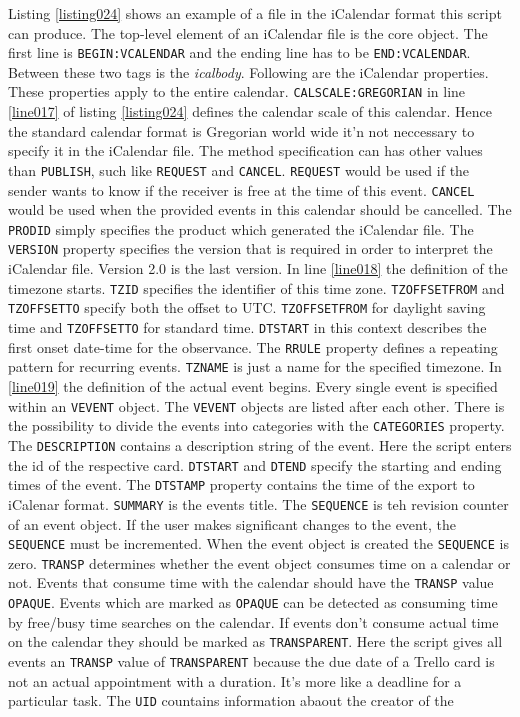 Listing \ref{listing024} shows an example of a file in the iCalendar format this script can produce. The top-level element of an iCalendar file is the core object. The first line is \lstinline{BEGIN:VCALENDAR} and the ending line has to be \lstinline{END:VCALENDAR}. Between these two tags is the \emph{icalbody}. Following are the iCalendar properties. These properties apply to the entire calendar. \lstinline{CALSCALE:GREGORIAN} in line \ref{line017} of listing \ref{listing024} defines the calendar scale of this calendar. Hence the standard calendar format is Gregorian world wide it'n not neccessary to specify it in the iCalendar file. The method specification can has other values than \lstinline{PUBLISH}, such like \lstinline{REQUEST} and \lstinline{CANCEL}. \lstinline{REQUEST} would be used if the sender wants to know if the receiver is free at the time of this event. \lstinline{CANCEL} would be used when the provided events in this calendar should be cancelled. The \lstinline{PRODID} simply specifies the product which generated the iCalendar file. The \lstinline{VERSION} property specifies the version that is required in order to interpret the iCalendar file. Version 2.0 is the last version. In line \ref{line018} the definition of the timezone starts. \lstinline{TZID} specifies the identifier of this time zone. \lstinline{TZOFFSETFROM} and \lstinline{TZOFFSETTO} specify both the offset to UTC. \lstinline{TZOFFSETFROM} for daylight saving time and \lstinline{TZOFFSETTO} for standard time. \lstinline{DTSTART} in this context describes the first onset date-time for the observance. The \lstinline{RRULE} property defines a repeating pattern for recurring events. \lstinline{TZNAME} is just a name for the specified timezone. In \ref{line019} the definition of the actual event begins. Every single event is specified within an \lstinline{VEVENT} object. The \lstinline{VEVENT} objects are listed after each other. There is the possibility to divide the events into categories with the \lstinline{CATEGORIES} property. The \lstinline{DESCRIPTION} contains a description string of the event. Here the script enters the id of the respective card. \lstinline{DTSTART} and \lstinline{DTEND} specify the starting and ending times of the event. The \lstinline{DTSTAMP} property contains the time of the export to iCalenar format. \lstinline{SUMMARY} is the events title. The \lstinline{SEQUENCE} is teh revision counter of an event object. If the user makes significant changes to the event, the \lstinline{SEQUENCE} must be incremented. When the event object is created the \lstinline{SEQUENCE} is  zero. \lstinline{TRANSP} determines whether the event object consumes time on a calendar or not. Events that consume time with the calendar should have the \lstinline{TRANSP} value \lstinline{OPAQUE}. Events which are marked as \lstinline{OPAQUE} can be detected as consuming time by free/busy time searches on the calendar. If events don't consume actual time on the calendar they should be marked as \lstinline{TRANSPARENT}. Here the script gives all events an \lstinline{TRANSP} value of \lstinline{TRANSPARENT} because the due date of a Trello card is not an actual appointment with a duration. It's more like a deadline for a particular task. The \lstinline{UID} countains information abaout the creator of the 